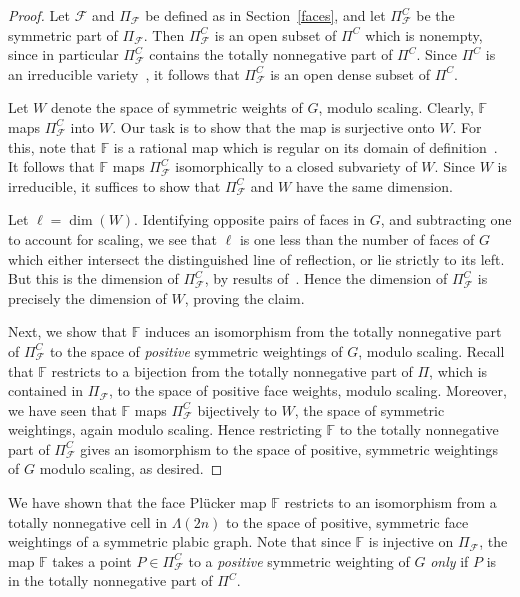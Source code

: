 \documentclass[ALCO,ThmDefs,Unicode,epreuves]{cedram}
\newcommand{\Lm}{\Lambda}
\begin{document}
\begin{proof}
Let $\mathcal{F}$ and $\Pi_{\mathcal{F}}$ be defined as in Section~\ref{faces}, and let $\Pi_{\mathcal{F}}^C$ be the symmetric part of $\Pi_{\mathcal{F}}$. Then $\Pi^C_{\mathcal{F}}$ is an open subset of $\Pi^C$ which is nonempty, since in particular $\Pi^C_{\mathcal{F}}$ contains the totally nonnegative part of $\Pi^C$. Since $\Pi^C$ is an irreducible variety~\cite{Kar18}, it follows that $\Pi^C_{\mathcal{F}}$ is an open dense subset of $\Pi^C$.

Let $W$ denote the space of symmetric weights of $G$, modulo scaling. Clearly, $\mathbb{F}$ maps $\Pi_{\mathcal{F}}^C$ into $W$. Our task is to show that the map is surjective onto $W$. For this, note that $\mathbb{F}$ is a rational map which is regular on its domain of definition~\cite{MS17}. It follows that $\mathbb{F}$ maps $\Pi_{\mathcal{F}}^C$ isomorphically to a closed subvariety of $W$. Since $W$ is irreducible, it suffices to show that $\Pi_{\mathcal{F}}^C$ and $W$ have the same dimension.

Let $\ell=\dim(W)$. Identifying opposite pairs of faces in $G$, and subtracting one to account for scaling, we see that $\ell$ is one less than the number of faces of $G$ which either intersect the distinguished line of reflection, or lie strictly to its left. But this is the dimension of $\Pi_{\mathcal{F}}^C$, by results of~\cite[Section 5]{Kar18}. Hence the dimension of $\Pi_{\mathcal{F}}^C$ is precisely the dimension of $W$, proving the claim.

Next, we show that $\mathbb{F}$ induces an isomorphism from the totally nonnegative part of $\Pi_{\mathcal{F}}^C$ to the space of \emph{positive} symmetric weightings of $G$, modulo scaling. Recall that $\mathbb{F}$ restricts to a bijection from the totally nonnegative part of $\Pi$, which is contained in $\Pi_{\mathcal{F}}$, to the space of positive face weights, modulo scaling. Moreover, we have seen that $\mathbb{F}$ maps $\Pi_{\mathcal{F}}^C$ bijectively to $W$, the space of symmetric weightings, again modulo scaling. Hence restricting $\mathbb{F}$ to the totally nonnegative part of $\Pi_{\mathcal{F}}^C$ gives an isomorphism to the space of positive, symmetric weightings of $G$ modulo scaling, as desired. \end{proof}

We have shown that the face Pl{\"u}cker map $\mathbb{F}$ restricts to an isomorphism from a totally nonnegative cell in $\Lm(2n)$ to the space of positive, symmetric face weightings of a symmetric plabic graph. 
Note that since $\mathbb{F}$ is injective on $\Pi_{\mathcal{F}}$, the map $\mathbb{F}$ takes a point $P \in\Pi_{\mathcal{F}}^C$ to a \emph{positive} symmetric weighting of $G$ \emph{only} if $P$ is in the totally nonnegative part of $\Pi^C$.
\end{document}
